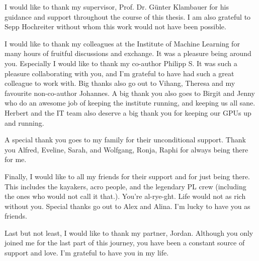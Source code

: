 %

I would like to thank my supervisor, Prof. Dr. Günter Klambauer for his guidance
and support throughout the course of this thesis. I am also grateful to Sepp Hochreiter 
without whom this work would not have been possible. 

I would like to thank my colleagues at the Institute of Machine Learning for
many hours of fruitful discussions and exchange. It was a pleasure being around
you. Especially I would like to thank my co-author Philipp S. It was such a
pleasure collaborating with you, and I'm grateful to have had such a great
colleague to work with. Big thanks also go out to Vihang, Theresa and my
favourite non-co-author Johannes. A big thank you also goes to Birgit and Jenny
who do an awesome job of keeping the institute running, and keeping us all sane.
Herbert and the IT team also deserve a big thank you for keeping our GPUs up and
running.

A special thank you goes to my family for their unconditional support. Thank you 
Alfred, Eveline, Sarah, and Wolfgang, Ronja, Raphi for always being there for me. 

Finally, I would like to all my friends for their support and for just being
there. This includes the kayakers, acro people, and the legendary PL crew
(including the ones who would not call it that.). You're al-rye-ght. Life would
not as rich without you. Special thanks go out to Alex and Alina. I'm lucky to
have you as friends. 

Last but not least, I would like to thank my partner, Jordan. Although you only 
joined me for the last part of this journey, you have been a constant source of
support and love. I'm grateful to have you in my life.

